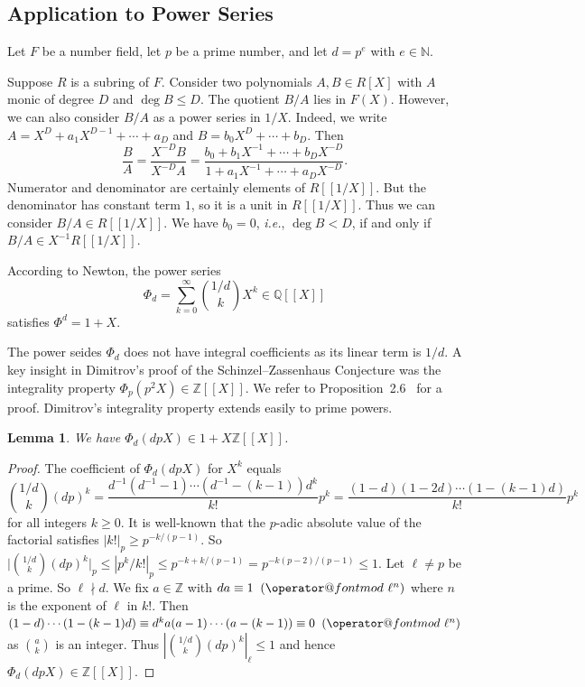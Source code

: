 \documentclass[12pt,oneside,a4]{amsart}
\makeatletter
\newcommand{\IN}{\mathbb{N}}
\newcommand{\IQ}{\mathbb{Q}}
\newcommand{\IZ}{\mathbb{Z}}
\newcounter{maincounter}
\numberwithin{maincounter}{section}
\numberwithin{equation}{section}
\newtheorem{lemma}[maincounter]{Lemma}
\def\imod#1{\allowbreak\mkern10mu({\operator@font mod}\,\,#1)}
\makeatother
\begin{document}
\subsection{Application to Power Series}
\label{sec:apppowerseries}

Let $F$ be a number field, let $p$ be a prime number, and let $d=p^e$
with $e\in\IN$.

Suppose $R$ is a subring of $F$.
Consider two polynomials $A,B\in R[X]$ 
with $A$ monic of degree $D$ and $\deg B\le D$.
The quotient $B/A$ lies in $F(X)$. However, we can
also consider $B/A$ as a power series in $1/X$. Indeed,
we write $A = X^D + a_{1}X^{D-1}+\cdots + a_D$ and $B = b_0 X^D +
\cdots + b_D$. Then
\begin{equation*}
  \frac{B}{A} = \frac{X^{-D}B}{X^{-D}A}= \frac{ b_0 + b_{1} X^{-1}+\cdots + b_D X^{-D}}
  { 1 + a_{1} X^{-1}+\cdots + a_D X^{-D}}.
\end{equation*}
Numerator and denominator are certainly elements of $R[[1/X]]$.
But the denominator has constant term $1$, so it is a unit in
$R[[1/X]]$. Thus we can consider $B/A\in R[[1/X]]$.
We have $b_0=0$, \textit{i.e.}, $\deg B < D$, if and only if
$B/A\in X^{-1}R[[1/X]]$. 

According to Newton, the power series
\begin{equation*}
  \Phi_d = \sum_{k=0}^\infty {1/d\choose k} X^k \in \IQ[[X]]
\end{equation*}
satisfies $\Phi^d = 1+X$.


The power seides $\Phi_d$ does not have integral
coefficients as its linear term is $1/d$. A key insight in Dimitrov's proof of the
Schinzel--Zassenhaus Conjecture was the integrality property
$\Phi_p(p^2 X) \in \IZ[[X]]$. We refer to
Proposition~2.6~\cite{dimitrov:SZ} for a proof. Dimitrov's integrality
property extends easily to prime powers.
\begin{lemma}
  \label{lem:Phidintegral}
  We have $\Phi_d(dpX)\in  1+X\IZ[[X]]$. 
\end{lemma}
\begin{proof}
  The coefficient of $\Phi_d(dpX)$ for $X^k$  
  equals
  \begin{equation*}
    {1/d\choose k}(dp)^k = \frac{d^{-1} (d^{-1} - 1) \cdots (d^{-1} -
      (k - 1))d^k}{k!} p^k
    = \frac{(1-d)(1-2d)\cdots (1-(k-1)d)}{k!}p^k
  \end{equation*}
  for all integers $k\ge 0$. It is well-known that the
  $p$-adic absolute value of the factorial
  satisfies $|k!|_p \ge p^{-k/(p-1)}$.
  So
  $\bigl|{1/d\choose k}(dp)^k \bigr|_p \le |p^k/k!|_p \le
  p^{-k+k/(p-1)}=p^{-k(p-2)/(p-1)}\le 1$.
  Let $\ell\not=p$ be a prime.
  So $\ell\nmid d$. 
  We fix $a\in\IZ$ with $da \equiv 1
  \imod{\ell^{n}}$
  where $n$ is the exponent of $\ell$ in $k!$.
  Then $(1-d)\cdots(1-(k-1)d)\equiv d^k a(a-1)\cdots(a-(k-1))\equiv 0\imod
  {\ell^n}$ as ${a\choose k}$ is an integer.
  Thus $\left|{1/d\choose k}(dp)^k\right|_\ell\le 1$ and
  hence $\Phi_d(dpX)\in\IZ[[X]]$. 
\end{proof}
\end{document}
